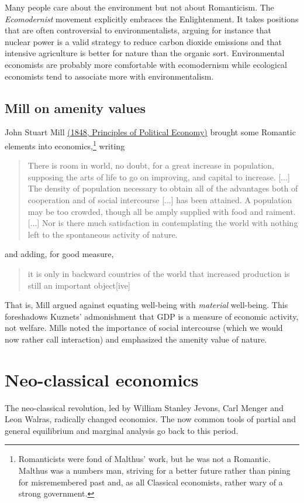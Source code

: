 Many people care about the environment but not about Romanticism. The \emph{Ecomodernist} movement explicitly embraces the Enlightenment. It takes positions that are often controversial to environmentalists, arguing for instance that nuclear power is a valid strategy to reduce carbon dioxide emissions and that intensive agriculture is better for nature than the organic sort. Environmental economists are probably more comfortable with ecomodernism while ecological economists tend to associate more with environmentalism.

\subsection{Mill on amenity values}
John Stuart Mill \href{https://www.gutenberg.org/files/30107/30107-pdf.pdf}{(1848, Principles of Political Economy)} brought some Romantic elements into economics,\footnote{Romanticists were fond of Malthus' work, but he was not a Romantic. Malthus was a numbers man, striving for a better future rather than pining for misremembered past and, as all Classical economists, rather wary of a strong government.} writing
\begin{quote}
    There is room in world, no doubt, for a great increase in population, supposing the arts of life to go on improving, and capital to increase. [...] The density of population necessary to obtain all of the advantages both of cooperation and of social intercourse [...] has been attained. A population may be too crowded, though all be amply supplied with food and raiment. [...] Nor is there much satisfaction in contemplating the world with nothing left to the spontaneous activity of nature.
\end{quote}
and adding, for good measure,
\begin{quote}
    it is only in backward countries of the world that increased production is still an important object[ive]
\end{quote}
That is, Mill argued against equating well-being with \emph{material} well-being. This foreshadows Kuznets' admonishment that GDP is a measure of economic activity, not welfare. Mills noted the importance of social intercourse (which we would now rather call interaction) and emphasized the amenity value of nature.

\section{Neo-classical economics}
The neo-classical revolution, led by William Stanley Jevons, Carl Menger and Leon Walras, radically changed economics. The now common tools of partial and general equilibrium and marginal analysis go back to this period.

